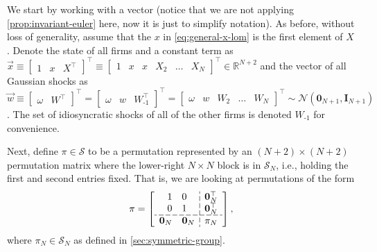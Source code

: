 \documentclass[12pt]{article}
\newcommand{\R}{\ensuremath{\mathbb{R}}}
\begin{document}
We start by working with a vector (notice that we are not applying \cref{prop:invariant-euler} here, now it is just to simplify notation). As before, without loss of generality, assume that the $x$ in \cref{eq:general-x-lom} is the first element of $X$. Denote the state of all firms and a constant term as $\vec{x} \equiv \begin{bmatrix}
1 & x & X^\top
\end{bmatrix}^{\top} \equiv \begin{bmatrix}
1 & x & x & X_2 & \ldots &  X_N
\end{bmatrix}^{\top} \in \R^{N+2}$ and the vector of all Gaussian shocks as $\vec{w}\equiv \begin{bmatrix}
\omega  & W^\top
\end{bmatrix}^{\top} =  \begin{bmatrix}
	\omega & w & W_{\text{-}1}^\top
	\end{bmatrix}^{\top} = \begin{bmatrix}
\omega & w & W_2 & \ldots & W_N
\end{bmatrix}^{\top}\sim \mathcal{N}(\mathbf{0}_{N+1},\mathbf{I}_{N+1})$.  The set of idiosyncratic shocks of all of the other firms is denoted $W_{\text{-}1}$ for convenience.
	
Next, define $\pi \in \mathcal{S}$ to be a permutation represented by an $(N+2)\times(N+2)$ permutation matrix where the lower-right $N\times N$ block is in $\mathcal{S}_N$, i.e., holding the first and second entries fixed. That is, we are looking at permutations of the form	
\begin{equation}
\pi = 
\left[\begin{array}{c;{5pt/2 pt}c}
\begin{matrix} 1 & 0 \\ 0  & 1 \end{matrix} & \begin{matrix} \mathbf{0}_N^\top \\ \mathbf{0}_N^\top \end{matrix} \\ \hdashline[5pt/2 pt] \begin{matrix}\mathbf{0}_N & \mathbf{0}_N\\
\end{matrix} & \pi_N
\end{array}\right],\label{eq:permutation-LQ}
\end{equation}
where $\pi_N \in \mathcal{S}_N$ as defined in \cref{sec:symmetric-group}.
\end{document}
